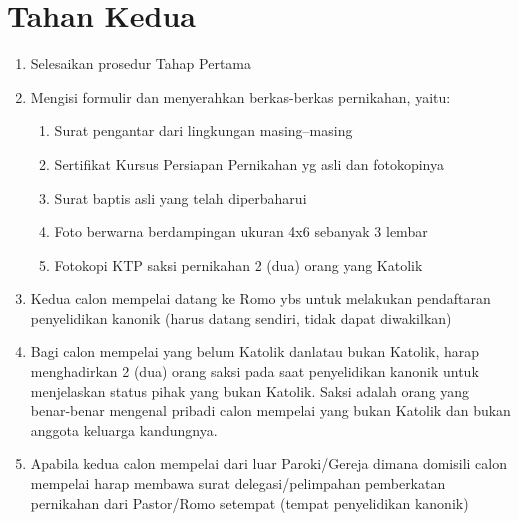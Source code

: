 \section{Tahan Kedua}
\begin{enumerate}
\item   Selesaikan prosedur Tahap Pertama
\item    Mengisi formulir dan menyerahkan berkas-berkas pernikahan,
    yaitu:
\begin{enumerate}
\item        Surat pengantar dari lingkungan masing--masing
\item        Sertifikat Kursus Persiapan Pernikahan yg asli dan fotokopinya
\item        Surat baptis asli yang telah diperbaharui
\item        Foto berwarna berdampingan ukuran 4x6 sebanyak 3 lembar
\item        Fotokopi KTP saksi pernikahan 2 (dua) orang yang Katolik
\end{enumerate}
\item    Kedua calon mempelai datang ke Romo ybs untuk melakukan pendaftaran penyelidikan kanonik (harus datang sendiri, tidak dapat diwakilkan)
\item    Bagi calon mempelai yang belum Katolik danlatau bukan Katolik, harap menghadirkan 2 (dua) orang saksi pada saat penyelidikan kanonik untuk menjelaskan status pihak yang bukan Katolik. Saksi adalah orang yang benar-benar mengenal pribadi calon mempelai yang bukan Katolik dan bukan anggota
    keluarga kandungnya.
\item    Apabila kedua calon mempelai dari luar Paroki/Gereja dimana domisili calon mempelai harap membawa surat delegasi/pelimpahan pemberkatan pernikahan dari Pastor/Romo setempat (tempat penyelidikan kanonik)
\end{enumerate}

